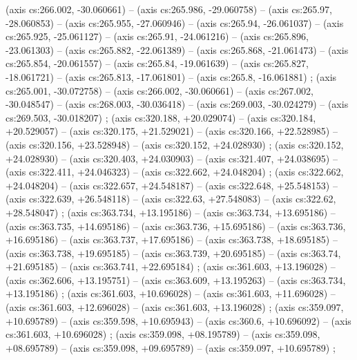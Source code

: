     (axis cs:266.002,    -30.060661) --  (axis cs:265.986,    -29.060758) --  (axis cs:265.97,    -28.060853) --  (axis cs:265.955,    -27.060946) --  (axis cs:265.94,    -26.061037) --  (axis cs:265.925,    -25.061127) --  (axis cs:265.91,    -24.061216) --  (axis cs:265.896,    -23.061303) --  (axis cs:265.882,    -22.061389) --  (axis cs:265.868,    -21.061473) --  (axis cs:265.854,    -20.061557) --  (axis cs:265.84,    -19.061639) --  (axis cs:265.827,    -18.061721) --  (axis cs:265.813,    -17.061801) --  (axis cs:265.8,    -16.061881) ;
    (axis cs:265.001,    -30.072758) --  (axis cs:266.002,    -30.060661) --  (axis cs:267.002,    -30.048547) --  (axis cs:268.003,    -30.036418) --  (axis cs:269.003,    -30.024279) --  (axis cs:269.503,    -30.018207) ;
    (axis cs:320.188,    +20.029074) --  (axis cs:320.184,    +20.529057) --  (axis cs:320.175,    +21.529021) --  (axis cs:320.166,    +22.528985) --  (axis cs:320.156,    +23.528948) --  (axis cs:320.152,    +24.028930) ;
    (axis cs:320.152,    +24.028930) --  (axis cs:320.403,    +24.030903) --  (axis cs:321.407,    +24.038695) --  (axis cs:322.411,    +24.046323) --  (axis cs:322.662,    +24.048204) ;
    (axis cs:322.662,    +24.048204) --  (axis cs:322.657,    +24.548187) --  (axis cs:322.648,    +25.548153) --  (axis cs:322.639,    +26.548118) --  (axis cs:322.63,    +27.548083) --  (axis cs:322.62,    +28.548047) ;
    (axis cs:363.734,    +13.195186) --  (axis cs:363.734,    +13.695186) --  (axis cs:363.735,    +14.695186) --  (axis cs:363.736,    +15.695186) --  (axis cs:363.736,    +16.695186) --  (axis cs:363.737,    +17.695186) --  (axis cs:363.738,    +18.695185) --  (axis cs:363.738,    +19.695185) --  (axis cs:363.739,    +20.695185) --  (axis cs:363.74,    +21.695185) --  (axis cs:363.741,    +22.695184) ;
    (axis cs:361.603,    +13.196028) --  (axis cs:362.606,    +13.195751) --  (axis cs:363.609,    +13.195263) --  (axis cs:363.734,    +13.195186) ;
    (axis cs:361.603,    +10.696028) --  (axis cs:361.603,    +11.696028) --  (axis cs:361.603,    +12.696028) --  (axis cs:361.603,    +13.196028) ;
    (axis cs:359.097,    +10.695789) --  (axis cs:359.598,    +10.695943) --  (axis cs:360.6,    +10.696092) --  (axis cs:361.603,    +10.696028) ;
    (axis cs:359.098,    +08.195789) --  (axis cs:359.098,    +08.695789) --  (axis cs:359.098,    +09.695789) --  (axis cs:359.097,    +10.695789) ;
